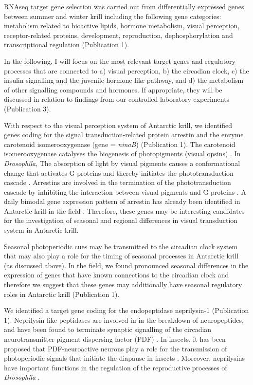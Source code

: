 RNAseq target gene selection was carried out from differentially expressed
genes between summer and winter krill including the following gene categories:
metabolism related to bioactive lipids, hormone metabolism, visual perception,
receptor-related proteins, development, reproduction, dephosphorylation and
transcriptional regulation (Publication 1).

In the following, I will focus on the most relevant target genes and regulatory
processes that are connected to a) visual perception, b) the circadian clock,
c) the insulin signalling and the juvenile-hormone like pathway, and d) the
metabolism of other signalling compounds and hormones. If appropriate, they
will be discussed in relation to findings from our controlled laboratory
experiments (Publication 3).

With respect to the visual perception system of Antarctic krill, we identified
genes coding for the signal transduction-related protein arrestin and the
enzyme carotenoid isomerooxygenase (gene = \textit{ninaB}) (Publication 1). The
carotenoid isomerooxygenase catalyses the biogenesis of photopigments (visual
opsins) \citep{voolstra_ninab_2010}. In \textit{Drosophila}, The absorption of
light by visual pigments causes a conformational change that activates
G-proteins and thereby initiates the phototransduction cascade
\citep{mazzotta_circadian_2016}.  Arrestins are involved in the termination of
the phototransduction cascade by inhibiting the interaction between visual
pigments and G-proteins \citep{montell_drosophila_2012}. A daily bimodal gene
expression pattern of arrestin has already been identified in Antarctic krill
in the field \citep{de_pitta_antarctic_2013}. Therefore, these genes may be
interesting candidates for the investigation of seasonal and regional
differences in visual transduction system in Antarctic krill.

Seasonal photoperiodic cues may be transmitted to the circadian clock system
that may also play a role for the timing of seasonal processes in Antarctic
krill (as discussed above). In the field, we found pronounced seasonal
differences in the expression of genes that have known connections to the
circadian clock and therefore we suggest that these genes may additionally have
seasonal regulatory roles in Antarctic krill (Publication 1). 


We identified a target gene coding for the endopeptidase neprilysin-1
(Publication 1). Neprilysin-like peptidases are involved in in the breakdown of
neuropeptides, and have been found to terminate synaptic signalling of the
circadian neurotransmitter pigment dispersing factor (PDF)
\citep{isaac_metabolic_2007}. In insects, it has been  proposed that
PDF-neuroactive neurons play a role for the transmission of photoperiodic
signals that initiate the diapause in insects \citep{hamanaka_synaptic_2005,
ikeno_involvement_2014}. Moreover, neprilysins have important functions in the
regulation of the reproductive processes of \textit{Drosophila}
\citep{sitnik_neprilysins:_2014}.


